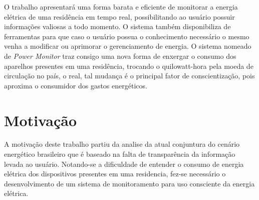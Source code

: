 
O trabalho apresentará uma forma barata e eficiente de monitorar a energia elétrica de uma residência em tempo real, possibilitando ao usuário
possuir informações valiosas a todo momento. O sistema também disponibiliza de ferramentas para que 
caso o usuário possua o conhecimento necessário o mesmo venha a modificar ou aprimorar o gerenciamento de energia. O sistema nomeado de \textit{Power Monitor}
traz consigo uma nova forma de enxergar o consumo dos aparelhos presentes em uma residência, trocando o quilowatt-hora pela moeda de circulação no país,
o real, tal mudança é o principal fator de conscientização, pois aproxima o consumidor dos gastos energéticos.


\section{Motivação}

A motivação deste trabalho partiu da analise da atual conjuntura do cenário energético brasileiro que é baseado na falta de transparência da 
informação levada ao usuário. Notando-se a dificuldade de entender o consumo de energia elétrica dos dispositivos presentes em uma 
residencia, fez-se necessário o desenvolvimento de um sistema de monitoramento para uso consciente da energia elétrica.

